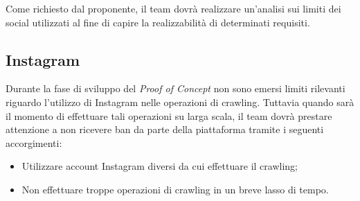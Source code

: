 Come richiesto dal proponente, il team dovrà realizzare un'analisi sui limiti dei social utilizzati al fine di capire la realizzabilità di determinati requisiti.

\subsection{Instagram}
Durante la fase di sviluppo del \textit{Proof of Concept} non sono emersi limiti rilevanti riguardo l'utilizzo di Instagram nelle operazioni di crawling. Tuttavia quando sarà il momento di effettuare tali operazioni su larga scala, il team dovrà prestare attenzione a non ricevere ban da parte della piattaforma tramite i seguenti accorgimenti:
\begin{itemize}
    \item Utilizzare account Instagram diversi da cui effettuare il crawling;
    \item Non effettuare troppe operazioni di crawling in un breve lasso di tempo.
\end{itemize}

